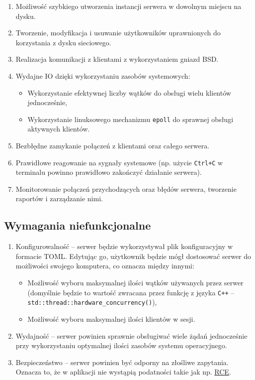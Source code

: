 \documentclass[10pt,a4paper]{article}
\begin{document}
\begin{enumerate}
    \item Możliwość szybkiego utworzenia instancji serwera w dowolnym miejscu na dysku.
    \item Tworzenie, modyfikacja i usuwanie użytkowników uprawnionych do korzystania z dysku sieciowego.
    \item Realizacja komunikacji z klientami z wykorzystaniem gniazd BSD.
    \item Wydajne IO dzięki wykorzystaniu zasobów systemowych:
    \begin{itemize}
        \item Wykorzystanie efektywnej liczby wątków do obsługi wielu klientów jednocześnie,
        \item Wykorzystanie linuksowego mechanizmu \texttt{epoll} do sprawnej obsługi aktywnych klientów.
    \end{itemize}
    \item Bezbłędne zamykanie połączeń z klientami oraz całego serwera.
    \item Prawidłowe reagowanie na sygnały systemowe (np. użycie \texttt{Ctrl+C} w terminalu powinno prawidłowo zakończyć działanie serwera).
    \item Monitorowanie połączeń przychodzących oraz błędów serwera, tworzenie raportów i zarządzanie nimi.
\end{enumerate}

\subsection{Wymagania niefunkcjonalne}

\begin{enumerate}
    \item Konfigurowalność -- serwer będzie wykorzystywał plik konfiguracyjny w formacie TOML. Edytując go, użytkownik będzie mógł dostosować serwer do możliwości swojego komputera, co oznacza między innymi:
    \begin{itemize}
        \item Możliwość wyboru maksymalnej ilości wątków używanych przez serwer (domyślnie będzie to wartość zwracana przez funkcję z języka \texttt{C++} -- \texttt{std::thread::hardware\_concurrency()}),
        \item Możliwość wyboru maksymalnej ilości klientów w sesji.
    \end{itemize}

    \item Wydajność -- serwer powinien sprawnie obsługiwać wiele żądań jednocześnie przy wykorzystaniu optymalnej ilości zasobów systemu operacyjnego.

    \item Bezpieczeństwo -- serwer powinien być odporny na złośliwe zapytania. Oznacza to, że w aplikacji nie wystąpią podatności takie jak np. \href{https://en.wikipedia.org/wiki/Arbitrary_code_execution}{RCE}.
\end{enumerate}
\end{document}
